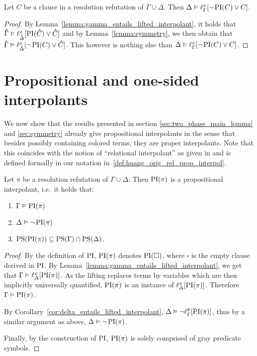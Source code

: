 \begin{corr}
	\label{cor:delta_entails_lifted_interpolant}
	Let $C$ be a clause in a resolution refutation of $\Gamma \cup \Delta$. 
	Then $\Delta \vDash \ell_{\Gamma}^{x}[ \lnot \operatorname{PI}(C) \lor C ]$.
\end{corr}
\begin{proof}
	By Lemma~\ref{lemma:gamma_entails_lifted_interpolant}, it holds that $\bm\hat{\Gamma} \vDash \ell_{\bm\hat{\Delta}}^{x}[ \operatorname{PI}(\bm\hat{C}) \lor \bm\hat{C} ]$  and 
	by Lemma~\ref{lemma:symmetry}, we then obtain that 
	$\bm\hat{\Gamma} \vDash \ell_{\bm\hat{\Delta}}^{x}[ \lnot \operatorname{PI}(C) \lor \bm\hat{C} ]$.
	This however is nothing else than 
	$\Delta \entails\nolinebreak \lft{\Gamma}{x}{ \lnot \PI(C) \lor C }$.
\end{proof}


\section{Propositional and one-sided interpolants}

We now show that the results presented in section \ref{sec:two_phase_main_lemma} and \ref{sec:symmetry}
already give propositional interpolants in the sense that besides possibly containing colored terms, they are proper interpolants.
Note that this coincides with the notion of ``relational interpolant'' as given in \cite{Huang95} and is defined formally in our notation in~\ref{def:huang_orig_rel_prop_interpol}.

\begin{corr}
	\label{cor:propositional_interpolant}
	Let $\pi$ be a resolution refutation of $\Gamma \cup \Delta$.
	Then $\operatorname{PI}(\pi)$ is a propositional interpolant, i.e.\ it holds that:
	\begin{enumerate}
		\item$\Gamma\vDash \operatorname{PI}(\pi)$
		\item$\Delta\vDash \lnot \operatorname{PI}(\pi)$
		\item $\operatorname{PS}(\operatorname{PI}(\pi)) \subseteq \operatorname{PS}(\Gamma) \cap \operatorname{PS}(\Delta)$.
	\end{enumerate}
\end{corr}
\begin{proof}
	By the definition of $\operatorname{PI}$, 
	$\operatorname{PI}(\pi)$ denotes $\operatorname{PI}(\square)$, where $\square$ is the empty clause derived in $\operatorname{PI}$.
	By Lemma~\ref{lemma:gamma_entails_lifted_interpolant}, we get that 
	$ \Gamma \vDash \ell_{\Delta}^{x}[\operatorname{PI}(\pi)]$.
	As the lifting replaces terms by variables which are then implicitly universally quantified, $\operatorname{PI}(\pi)$ is an instance of $\ell_{\Delta}^{x}[\operatorname{PI}(\pi)]$.
	Therefore $\Gamma \vDash \operatorname{PI}(\pi)$.

	By Corollary~\ref{cor:delta_entails_lifted_interpolant}, $\Delta \vDash \lnot \ell_{\Gamma}^{y}[\operatorname{PI}(\pi)]$,
	thus by a similar argument as above, $\Delta \vDash \lnot \operatorname{PI}(\pi)$.


	Finally, by the construction of $\operatorname{PI}$, $\operatorname{PI}(\pi)$ is solely comprised of gray predicate symbols.
\end{proof}


